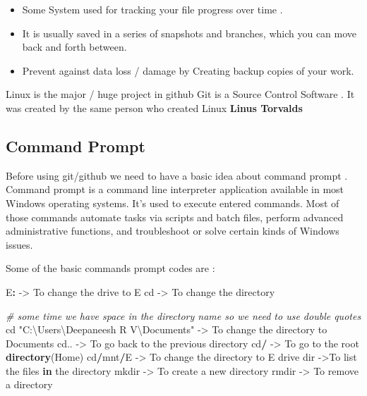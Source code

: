 \documentclass[
]{article}
\newenvironment{Shaded}{\begin{snugshade}}{\end{snugshade}}
\newcommand{\CommentTok}[1]{\textcolor[rgb]{0.56,0.35,0.01}{\textit{#1}}}
\newcommand{\ControlFlowTok}[1]{\textcolor[rgb]{0.13,0.29,0.53}{\textbf{#1}}}
\newcommand{\FunctionTok}[1]{\textcolor[rgb]{0.13,0.29,0.53}{\textbf{#1}}}
\newcommand{\NormalTok}[1]{#1}
\newcommand{\OtherTok}[1]{\textcolor[rgb]{0.56,0.35,0.01}{#1}}
\newcommand{\SpecialCharTok}[1]{\textcolor[rgb]{0.81,0.36,0.00}{\textbf{#1}}}
\newcommand{\StringTok}[1]{\textcolor[rgb]{0.31,0.60,0.02}{#1}}
\providecommand{\tightlist}{%
  \setlength{\itemsep}{0pt}\setlength{\parskip}{0pt}}
\begin{document}
\begin{itemize}
\tightlist
\item
  Some System used for tracking your file progress over time .
\item
  It is usually saved in a series of snapshots and branches, which you
  can move back and forth between.
\item
  Prevent against data loss / damage by Creating backup copies of your
  work.
\end{itemize}

Linux is the major / huge project in github Git is a Source Control
Software . It was created by the same person who created Linux
\textbf{Linus Torvalds}

\subsection{Command Prompt}\label{command-prompt}

Before using git/github we need to have a basic idea about command
prompt . Command prompt is a command line interpreter application
available in most Windows operating systems. It's used to execute
entered commands. Most of those commands automate tasks via scripts and
batch files, perform advanced administrative functions, and troubleshoot
or solve certain kinds of Windows issues.

Some of the basic commands prompt codes are :

\begin{Shaded}
\begin{Highlighting}[]
\NormalTok{E}\SpecialCharTok{:} \OtherTok{{-}\textgreater{}}\NormalTok{ To change the drive to E}
\NormalTok{cd }\OtherTok{{-}\textgreater{}}\NormalTok{ To change the directory}

\CommentTok{\# some time we have space in the directory name so we need to use double quotes}
\NormalTok{cd }\StringTok{"C:\textbackslash{}Users\textbackslash{}Deepaneesh R V\textbackslash{}Documents"} \OtherTok{{-}\textgreater{}}\NormalTok{ To change the directory to Documents}
\NormalTok{cd.. }\OtherTok{{-}\textgreater{}}\NormalTok{ To go back to the previous directory}
\NormalTok{cd}\SpecialCharTok{/} \OtherTok{{-}\textgreater{}}\NormalTok{ To go to the root }\FunctionTok{directory}\NormalTok{(Home)}
\NormalTok{cd}\SpecialCharTok{/}\NormalTok{mnt}\SpecialCharTok{/}\NormalTok{E }\OtherTok{{-}\textgreater{}}\NormalTok{ To change the directory to E drive }
\NormalTok{dir }\OtherTok{{-}\textgreater{}}\NormalTok{To list the files }\ControlFlowTok{in}\NormalTok{ the directory}
\NormalTok{mkdir }\OtherTok{{-}\textgreater{}}\NormalTok{ To create a new directory}
\NormalTok{rmdir }\OtherTok{{-}\textgreater{}}\NormalTok{ To remove a directory}
\end{Highlighting}
\end{Shaded}
\end{document}
